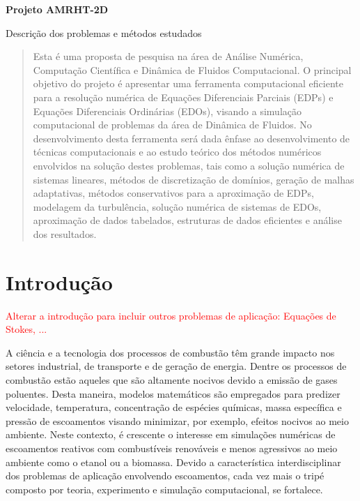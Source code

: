 \documentclass[12pt, brazil]{article}
\begin{document}
\vspace*{2cm}
\begin{center}
{\large {\bf Projeto AMRHT-2D}} \\

\vspace{5cm}

Descrição dos problemas e métodos estudados





\end{center}
\thispagestyle{empty}

\newpage

\tableofcontents
\thispagestyle{empty}
\newpage
{}\setcounter{page}{1}



\begin{abstract}
  Esta é uma proposta de pesquisa na área de Análise Numérica, Computação Científica  e Dinâmica de Fluidos Computacional. O principal objetivo do projeto é apresentar uma ferramenta computacional eficiente para a resolução numérica de Equações Diferenciais Parciais (EDPs) e Equações Diferenciais Ordinárias (EDOs), visando a simulação computacional de problemas da área de Dinâmica de Fluidos. No desenvolvimento desta ferramenta será dada ênfase ao desenvolvimento de técnicas computacionais e ao estudo teórico dos métodos numéricos envolvidos na solução destes problemas, tais como a solução numérica de sistemas lineares, métodos de discretização de domínios, geração de malhas adaptativas, métodos conservativos para a aproximação de EDPs, modelagem da turbulência, solução numérica de sistemas de EDOs, aproximação de dados tabelados, estruturas de dados eficientes e análise dos resultados.
\end{abstract}


\section{Introdução}\label{ss.introducao}

\textcolor{red}{Alterar a introdução para incluir outros problemas de aplicação: Equações de Stokes, ...}

\hspace{1pc} A ciência e a tecnologia dos processos de combustão têm grande impacto nos setores industrial, de transporte e de geração de energia. Dentre os processos de combustão estão aqueles que são altamente nocivos devido a emissão de gases poluentes. Desta maneira, modelos matemáticos são empregados para predizer velocidade, temperatura, concentração de espécies químicas, massa específica e pressão de escoamentos visando minimizar, por exemplo, efeitos nocivos ao meio ambiente. Neste contexto, é crescente o interesse em simulações numéricas de escoamentos reativos com combustíveis renováveis e menos agressivos ao meio ambiente como o etanol ou a biomassa. Devido a característica interdisciplinar dos problemas de aplicação envolvendo escoamentos, cada vez mais o tripé composto por teoria, experimento e simulação computacional, se fortalece.  
\end{document}
